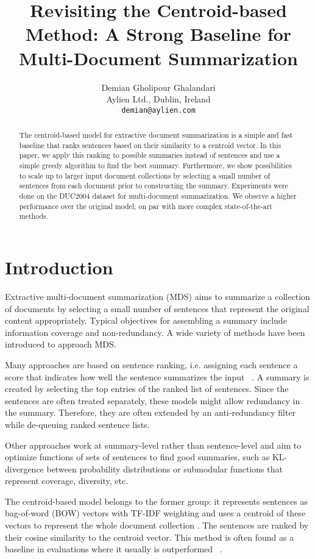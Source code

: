 \documentclass[11pt,letterpaper]{article}
\title{Revisiting the Centroid-based Method: A Strong Baseline for Multi-Document Summarization}
\author{Demian Gholipour Ghalandari \\
Aylien Ltd., Dublin, Ireland \\
{\tt demian@aylien.com}}
\date{}
\begin{document}
\maketitle

\begin{abstract}
  The centroid-based model for extractive document summarization is a simple and fast baseline that ranks sentences based on their similarity to a centroid vector. In this paper, we apply this ranking to possible summaries instead of sentences and use a simple greedy algorithm to find the best summary. Furthermore, we show possibilities to scale up to larger input document collections by selecting a small number of sentences from each document prior to constructing the summary. Experiments were done on the DUC2004 dataset for multi-document summarization. We observe a higher performance over the original model, on par with more complex state-of-the-art methods. 
\end{abstract}
\section{Introduction}
Extractive multi-document summarization (MDS) aims to summarize a collection of documents by selecting a small number of sentences that represent the original content appropriately. Typical objectives for assembling a summary include information coverage and non-redundancy. A wide variety of methods have been introduced to approach MDS. 

Many approaches are based on sentence ranking, i.e. assigning each sentence a score that indicates how well the sentence summarizes the input ~\cite{erkan2004lexrank, hong2014improving, cao2015ranking}. A summary is created by selecting the top entries of the ranked list of sentences. Since the sentences are often treated separately, these  models might allow redundancy in the summary. Therefore, they are often extended by an anti-redundancy filter while de-queuing ranked sentence lists. 

Other approaches work at summary-level rather than sentence-level and aim to optimize functions of sets of sentences to find good summaries, such as KL-divergence between probability distributions \cite{haghighi2009exploring} or submodular functions that represent coverage, diversity, etc. \cite{lin2011class}

The centroid-based model belongs to the former group: it represents sentences as bag-of-word (BOW) vectors with TF-IDF weighting and uses a centroid of these vectors to represent the whole document collection \cite{radev2004centroid}. The sentences are ranked by their cosine similarity to the centroid vector. This method is often found as a baseline in evaluations where it usually is outperformed ~\cite{erkan2004lexrank, hong2014repository}.  
\end{document}
